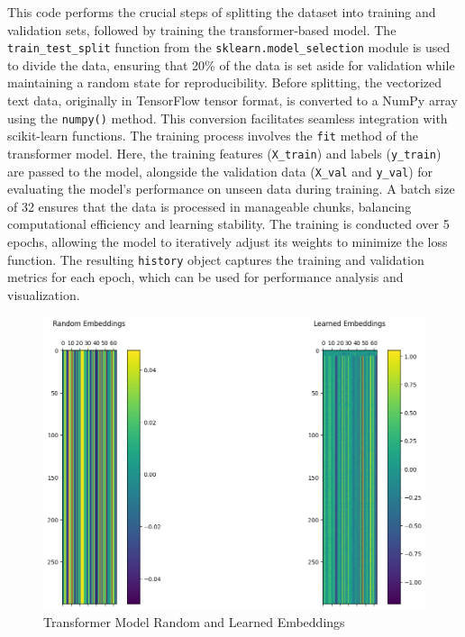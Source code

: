 \noindent
This code performs the crucial steps of splitting the dataset into training and validation sets, followed by training the transformer-based model. The \texttt{train\_test\_split} function from the \texttt{sklearn.model\_selection} module is used to divide the data, ensuring that 20\% of the data is set aside for validation while maintaining a random state for reproducibility. Before splitting, the vectorized text data, originally in TensorFlow tensor format, is converted to a NumPy array using the \texttt{numpy()} method. This conversion facilitates seamless integration with scikit-learn functions. The training process involves the \texttt{fit} method of the transformer model. Here, the training features (\texttt{X\_train}) and labels (\texttt{y\_train}) are passed to the model, alongside the validation data (\texttt{X\_val} and \texttt{y\_val}) for evaluating the model's performance on unseen data during training. A batch size of 32 ensures that the data is processed in manageable chunks, balancing computational efficiency and learning stability. The training is conducted over 5 epochs, allowing the model to iteratively adjust its weights to minimize the loss function. The resulting \texttt{history} object captures the training and validation metrics for each epoch, which can be used for performance analysis and visualization.

\pagebreak

\begin{figure}[h!]  
    \centering
    \includegraphics[width=1.0\textwidth]{Images/T EMBED.png}  
    \caption{Transformer Model Random and Learned Embeddings}
    \label{lstm t embed}  %
\end{figure}

